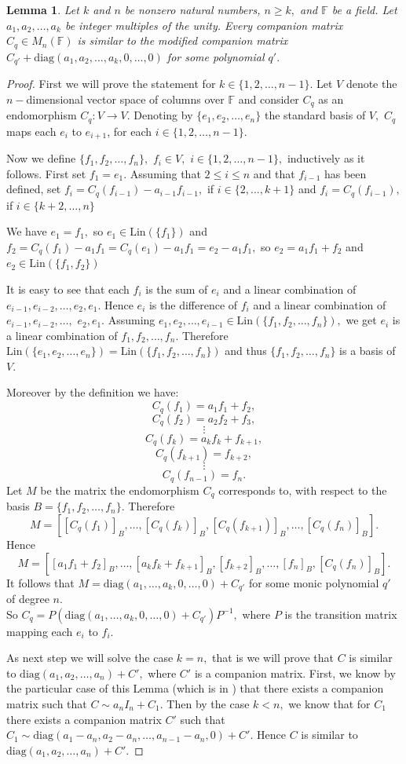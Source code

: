 \documentclass[11pt]{amsart}
\newtheorem{lem}[thm]{Lemma}
\theoremstyle{definition}
\numberwithin{equation}{section}
\newcommand{\diag}{\mathrm{diag}}
\newcommand{\F}{\mathbb{F}}
\begin{document}
\begin{lem}\label{use1}
 Let $k$ and $n$ be nonzero natural numbers, $n\geq k,$ and $\F$ be a field. Let $a_1,a_2,\dots,a_k$ be integer multiples of the unity. Every companion matrix $C_q\in M_n(\mathbb{F})$ is similar to the modified companion matrix  $C_{q'}+\diag (a_1,a_2,\dots,a_k,0,\dots,0)$ for some polynomial $q'.$
\end{lem}
\begin{proof}
First we will prove the statement for $k\in \{1,2,\dots,n-1\}.$
 Let $V$ denote the $n-$dimensional vector space of columns over $\mathbb{F}$ and consider $C_q$ as an endomorphism $C_q:V\rightarrow V.$ Denoting by
$\{e_1,e_2,\ldots,e_n\}$ the standard basis of $V,$ $C_q$ maps each $e_i$ to $e_{i+1}$, for each $i\in\{1,2,\ldots,n-1\}.$

Now we define $\{f_1,f_2,\ldots,f_n\},$ $f_i\in V,$ $i\in\{1,2,\ldots,n-1\},$ inductively as it follows. First set $f_1=e_1$. Assuming that $2\leq i\leq n$ and that $f_{i-1}$ has been defined, set $f_i=C_q(f_{i-1})-a_{i-1}f_{i-1},$ if $i\in \{2,\ldots,k+1\}$  and $f_i=C_q(f_{i-1}),$ if $i\in \{k+2,\ldots,n\}$

We have $e_1=f_1,$ so $e_1\in \textrm{Lin}(\{f_1\})$ and $f_2=C_q(f_1)-a_1f_1=C_q(e_1)-a_1f_1=e_2-a_1f_1,$ so $e_2=a_1f_1+f_2$ and $e_2\in \textrm{Lin}(\{f_1,f_2\})$

It is easy to see that each $f_i$ is the sum of $e_i$ and a linear combination of $e_{i-1},e_{i-2},\ldots,e_2,e_1$. Hence $e_i$ is the difference of $f_i$ and a linear combination of $e_{i-1},e_{i-2},\ldots,$ $e_2,e_1$. Assuming $e_1,e_2,\ldots,e_{i-1}\in \textrm{Lin}(\{f_1,f_2,\ldots,f_n\}),$ we get $e_i$ is a linear
combination of $f_1,f_2,\ldots,f_n$. Therefore $\textrm{Lin}(\{e_1,e_2,\ldots,e_n\})=\textrm{Lin}(\{f_1,f_2,\ldots,f_n\})$ and thus $\{f_1,f_2,\ldots,f_n\}$ is a basis of $V.$

Moreover by the definition we have:
$$C_q(f_1)=a_1f_1+f_2,$$
$$C_q(f_2)=a_2f_2+f_3,$$
$$ \vdots $$
$$C_q(f_k)=a_kf_k+f_{k+1},$$
$$C_q(f_{k+1})=f_{k+2},$$
$$ \vdots $$
$$C_q(f_{n-1})=f_n.$$
Let $M$ be the matrix the endomorphism $C_q$ corresponds to, with respect to the basis $B=\{f_1,f_2,\ldots,f_n\}$. Therefore
 $$M=[[C_q(f_1)]_B,\ldots,[C_q(f_{k})]_B,[C_q(f_{k+1})]_B,\dots,[C_q(f_n)]_B].$$
 Hence
 $$M=[[a_1f_1+f_2]_B,\ldots,[a_kf_k+f_{k+1}]_B,[f_{k+2}]_B,\ldots,[f_n]_B,[C_q(f_n)]_B].$$
 It follows that $M=\diag (a_1,\dots,a_k ,0,\dots,0)+C_{q'}$ for some monic polynomial $q'$ of degree $n.$
\\ So $C_q=P(\diag (a_1,\dots,a_k ,0,\dots,0)+C_{q'})P^{-1},$ where $P$ is the transition matrix mapping each $e_i$ to $f_i.$

 As next step we will solve  the case $k=n,$ that is we will prove that $C$ is similar to $\diag(a_1,a_2,\dots,a_n)+C',$ where $C'$ is a companion matrix. First, we know by the particular case of this Lemma (which is in \cite{Pojar}) that there exists a companion matrix such that $C\sim a_nI_n+C_1.$ Then by the case $k<n,$ we know that for $C_1$ there exists a companion matrix $C'$ such that $C_1\sim \diag(a_1-a_n,a_2-a_n,\dots,a_{n-1}-a_n,0)+C'.$ Hence $C$ is similar to $\diag(a_1,a_2,\dots,a_n)+C'.$

\end{proof}
\end{document}
